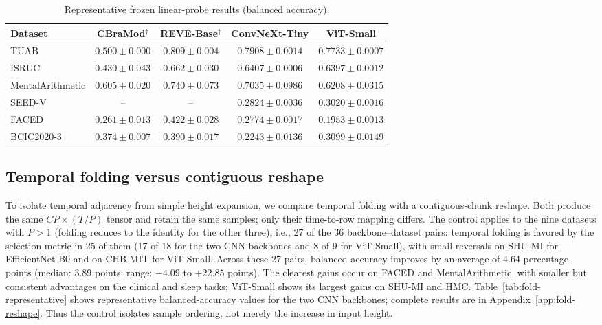 \begin{table}[t]
\centering\small
\setlength{\tabcolsep}{4pt}
\caption{Representative frozen linear-probe results (balanced accuracy).}
\label{tab:linear-probe-representative}
\begin{tabular}{@{}lcccc@{}}\toprule
Dataset & CBraMod$^\dagger$ & REVE-Base$^\dagger$ & ConvNeXt-Tiny & ViT-Small \\ \midrule
TUAB & $0.500\pm0.000$ & $0.809\pm0.004$ & $0.7908\pm0.0014$ & $0.7733\pm0.0007$ \\
ISRUC & $0.430\pm0.043$ & $0.662\pm0.030$ & $0.6407\pm0.0006$ & $0.6397\pm0.0012$ \\
MentalArithmetic & $0.605\pm0.020$ & $0.740\pm0.073$ & $0.7035\pm0.0986$ & $0.6208\pm0.0315$ \\
SEED-V & -- & -- & $0.2824\pm0.0036$ & $0.3020\pm0.0016$ \\
FACED & $0.261\pm0.013$ & $0.422\pm0.028$ & $0.2774\pm0.0017$ & $0.1953\pm0.0013$ \\
BCIC2020-3 & $0.374\pm0.007$ & $0.390\pm0.017$ & $0.2243\pm0.0136$ & $0.3099\pm0.0149$ \\
\bottomrule\end{tabular}
\end{table}

\subsection{Temporal folding versus contiguous reshape}
\label{sec:fold-reshape}

To isolate temporal adjacency from simple height expansion, we compare
temporal folding with a contiguous-chunk reshape. Both produce the
same $CP\times(T/P)$ tensor and retain the same samples; only their time-to-row
mapping differs. The control applies to the nine datasets with $P>1$ (folding
reduces to the identity for the other three), i.e., 27 of the 36
backbone--dataset pairs: temporal folding is favored by the selection metric in 25 of them (17 of 18
for the two CNN backbones and 8 of 9 for ViT-Small), with small reversals on
SHU-MI for EfficientNet-B0 and on CHB-MIT for ViT-Small. Across these 27 pairs,
balanced accuracy improves by an average of 4.64 percentage points (median: 3.89 points;
range: $-4.09$ to $+22.85$ points). The clearest gains
occur on FACED and MentalArithmetic, with smaller but consistent advantages on
the clinical and sleep tasks; ViT-Small shows its largest gains on SHU-MI and
HMC. Table~\ref{tab:fold-representative} shows representative balanced-accuracy
values for the two CNN backbones; complete results are in
Appendix~\ref{app:fold-reshape}. Thus the control isolates sample ordering,
not merely the increase in input height.


